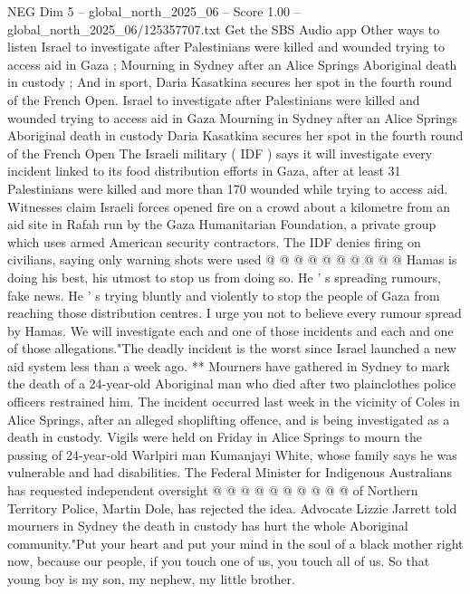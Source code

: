\begin{textsample}{NEG Dim 5 – global\_north\_2025\_06 – Score 1.00 – global\_north\_2025\_06/125357707.txt}  \label{ex:f5_neg_381}
Get the SBS Audio app Other ways to listen Israel to investigate after Palestinians were killed and wounded trying to access aid in Gaza ; Mourning in Sydney after an Alice Springs Aboriginal death in custody ; And in sport, Daria Kasatkina secures her spot in the fourth round of the French Open.
Israel to investigate after Palestinians were killed and wounded trying to access aid in Gaza Mourning in Sydney after an Alice Springs Aboriginal death in custody Daria Kasatkina secures her spot in the fourth round of the French Open The Israeli military ( IDF ) says it will investigate every incident linked to its food distribution efforts in Gaza, after at least 31 Palestinians were killed and more than 170 wounded while trying to access aid.
Witnesses claim Israeli forces opened fire on a crowd about a kilometre from an aid site in Rafah run by the Gaza Humanitarian Foundation, a private group which uses armed American security contractors.
The IDF denies firing on civilians, saying only warning shots were used @ @ @ @ @ @ @ @ @ @ Hamas is doing his best, his utmost to stop us from doing so.
He ' s spreading rumours, fake news.
He ' s trying bluntly and violently to stop the people of Gaza from reaching those distribution centres.
I urge you not to believe every rumour spread by Hamas.
We will investigate each and one of those incidents and each and one of those allegations."The deadly incident is the worst since Israel launched a new aid system less than a week ago. ** Mourners have gathered in Sydney to mark the death of a 24-year-old Aboriginal man who died after two plainclothes police officers restrained him.
The incident occurred last week in the vicinity of Coles in Alice Springs, after an alleged shoplifting offence, and is being investigated as a death in custody.
Vigils were held on Friday in Alice Springs to mourn the passing of 24-year-old Warlpiri man Kumanjayi White, whose family says he was vulnerable and had disabilities.
The Federal Minister for Indigenous Australians has requested independent oversight @ @ @ @ @ @ @ @ @ @ of Northern Territory Police, Martin Dole, has rejected the idea.
Advocate Lizzie Jarrett told mourners in Sydney the death in custody has hurt the whole Aboriginal community."Put your heart and put your mind in the soul of a black mother right now, because our people, if you touch one of us, you touch all of us.
So that young boy is my son, my nephew, my little brother.

\end{textsample}
